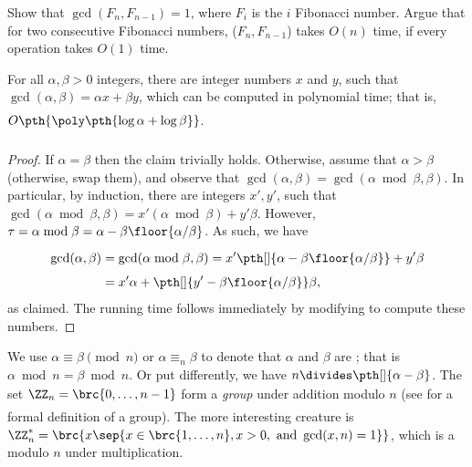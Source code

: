 \begin{exercise}
    Show that $\gcd(F_n, F_{n-1}) =1$, where $F_i$ is the $i$\th
    Fibonacci number. Argue that for two consecutive Fibonacci
    numbers, \allowbreak($F_n,F_{n-1}$) takes
    $O(n)$ time, if every operation takes $O(1)$ time.
\end{exercise}

\begin{lemma}
    For all $\alpha, \beta > 0$ integers, there are integer numbers
    $x$ and $y$, such that $\gcd(\alpha,\beta) = \alpha x + \beta y$,
    which can be computed in polynomial time; that is, $O\pth{
       \biggl. \poly \pth{ \Bigl. \log \alpha + \log \beta }}$.
\end{lemma}

\begin{proof}
    If $\alpha = \beta$ then the claim trivially holds. Otherwise,
    assume that $\alpha > \beta$ (otherwise, swap them), and observe
    that $\gcd(\alpha, \beta) = \gcd(\alpha \bmod \beta, \beta)$. In
    particular, by induction, there are integers $x', y'$, such that
    $\gcd(\alpha \bmod \beta, \beta) = x'(\alpha \bmod \beta) + y'
    \beta$. However, $\tau = \alpha \bmod \beta = \alpha - \beta
    \floor{ \alpha / \beta}$. As such, we have
    \begin{align*}
        \gcd(\alpha, \beta)%
        &=%
        \gcd(\alpha \bmod \beta, \beta)%
        =%
        x'\pth[]{ \Bigl. \alpha - \beta \floor{ \alpha / \beta} } +
        y'\beta\\
        &=%
        x'\alpha + \pth[]{y' - \beta \floor{ \alpha / \beta} } \beta,%
    \end{align*}
    as claimed. The running time follows immediately by modifying
    \algGCD to compute these numbers.
\end{proof}

We use $\alpha \equiv \beta \pmod{n}$ or $\alpha \equiv_n \beta$ to
denote that $\alpha$ and $\beta$ are ;
that is $\alpha \bmod n = \beta \bmod n$. Or put differently, we have
$n \divides \pth[]{\alpha - \beta}$. The set $\ZZ_n = \brc{0, \ldots,
   n-1 \Bigl. }$ form a \emph{group} under addition modulo $n$ (see
 for a formal definition of a group).  The more
interesting creature is $\ZZ_n^* = \brc{x \sep{ x \in \brc{1,\ldots,
         n}, x > 0, \text{ and } \gcd(x, n) =1}}$, which is a
 modulo $n$ under multiplication.


